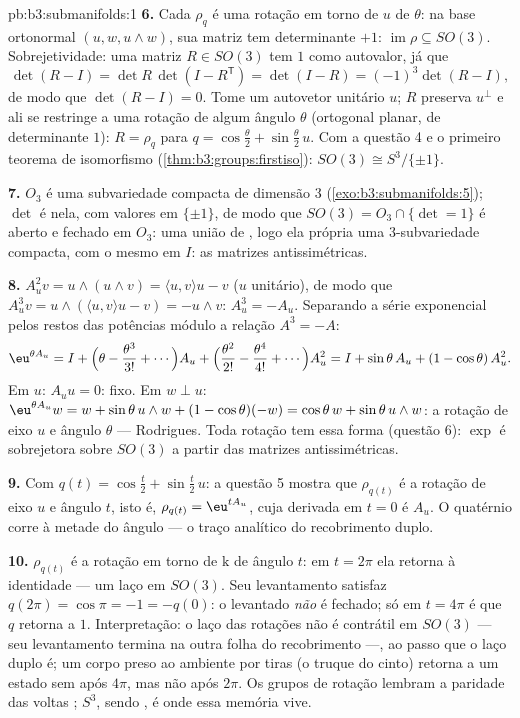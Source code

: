 \begin{solution}{pb:b3:submanifolds:1}
\textbf{6.} Cada $\rho_q$ é uma rotação em torno de $u$ de
$\theta$: na base ortonormal $(u, w, u\wedge w)$, sua
matriz tem determinante $+1$: $\operatorname{im}\rho \subseteq
SO(3)$. Sobrejetividade: uma matriz $R \in SO(3)$ tem $1$ como
autovalor, já que
\[
\det(R - I) = \det R\,\det(I - R^{\mathsf T}) = \det(I - R)
= (-1)^3\det(R - I),
\]
de modo que $\det(R - I) = 0$. Tome um autovetor unitário $u$; $R$
preserva $u^\perp$ e ali se restringe a uma rotação de
algum ângulo $\theta$ (ortogonal planar, de determinante $1$):
$R = \rho_q$ para $q = \cos\frac\theta2 +
\sin\frac\theta2\,u$. Com a questão 4 e o primeiro
teorema de isomorfismo (\cref{thm:b3:groups:firstiso}): $SO(3)
\cong S^3/\{\pm1\}$.

\textbf{7.} $O_3$ é uma subvariedade compacta de dimensão $3$
(\cref{exo:b3:submanifolds:5}); $\det$ é  nela,
com valores em $\{\pm1\}$, de modo que $SO(3) = O_3\cap\{\det = 1\}$
é aberto e fechado em $O_3$: uma união de ,
logo ela própria uma $3$-subvariedade compacta, com o mesmo  em $I$: as matrizes antissimétricas.

\textbf{8.} $A_u^2v = u\wedge(u\wedge v) = \langle u,
v\rangle u - v$ ($u$ unitário), de modo que $A_u^3v = u\wedge(\langle
u,v\rangle u - v) = -u\wedge v$: $A_u^3 = -A_u$. Separando
a série exponencial pelos restos das potências módulo a relação
$A^3 = -A$:
\[
\eu^{\theta A_u} = I + \Bigl(\theta - \frac{\theta^3}{3!} +
\cdots\Bigr)A_u + \Bigl(\frac{\theta^2}{2!} -
\frac{\theta^4}{4!} + \cdots\Bigr)A_u^2
= I + \sin\theta\,A_u + (1 - \cos\theta)\,A_u^2 .
\]
Em $u$: $A_uu = 0$: fixo. Em $w \perp u$: $\eu^{\theta
A_u}w = w + \sin\theta\,u\wedge w + (1 - \cos\theta)(-w) =
\cos\theta\,w + \sin\theta\,u\wedge w$: a rotação de eixo
$u$ e ângulo $\theta$ --- Rodrigues. Toda rotação tem essa
forma (questão 6): $\exp$ é sobrejetora sobre $SO(3)$ a partir das
matrizes antissimétricas.

\textbf{9.} Com $q(t) = \cos\frac t2 + \sin\frac t2\,u$:
a questão 5 mostra que $\rho_{q(t)}$ é a rotação de eixo $u$
e ângulo $t$, isto é, $\rho_{q(t)} = \eu^{tA_u}$, cuja
derivada em $t = 0$ é $A_u$. O quatérnio corre à metade
do ângulo --- o traço analítico do recobrimento duplo.

\textbf{10.} $\rho_{q(t)}$ é a rotação em torno de $\mathrm k$
de ângulo $t$: em $t = 2\pi$ ela retorna à identidade ---
um laço em $SO(3)$. Seu levantamento satisfaz $q(2\pi) = \cos\pi =
-1 = -q(0)$: o  levantado \emph{não} é fechado; só em
$t = 4\pi$ é que $q$ retorna a $1$. Interpretação: o laço
das rotações  não é contrátil em $SO(3)$ --- seu
levantamento termina na outra folha do recobrimento ---, ao passo que o
laço duplo é; um corpo preso ao ambiente por
tiras (o truque do cinto) retorna a um estado sem  após
$4\pi$, mas não após $2\pi$. Os grupos de rotação lembram a
paridade das voltas ; $S^3$, sendo , é
onde essa memória vive.


\end{solution}

